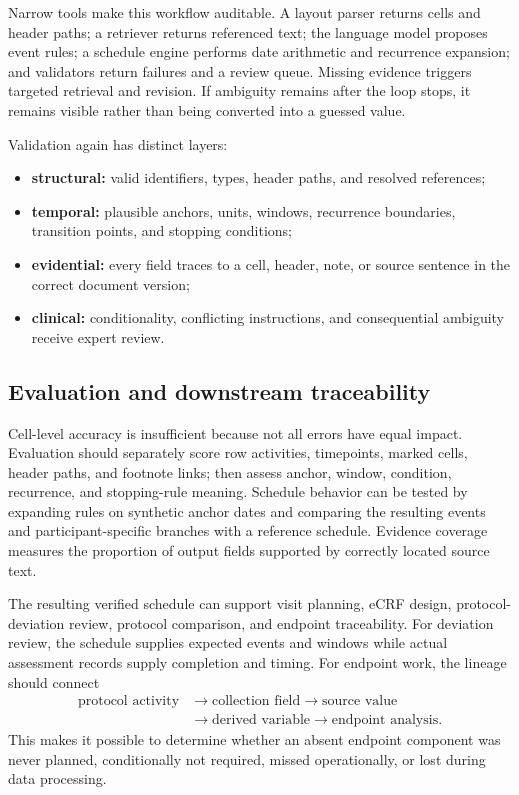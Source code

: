 \documentclass[12pt,oneside]{book}
\numberwithin{equation}{section}
\theoremstyle{definition}
\theoremstyle{plain}
\theoremstyle{remark}
\begin{document}
Narrow tools make this workflow auditable.  A layout parser returns cells and
header paths; a retriever returns referenced text; the language model proposes
event rules; a schedule engine performs date arithmetic and recurrence
expansion; and validators return failures and a review queue.  Missing evidence
triggers targeted retrieval and revision.  If ambiguity remains after the loop
stops, it remains visible rather than being converted into a guessed value.

Validation again has distinct layers:
\begin{itemize}
    \item \textbf{structural:} valid identifiers, types, header paths, and
    resolved references;
    \item \textbf{temporal:} plausible anchors, units, windows, recurrence
    boundaries, transition points, and stopping conditions;
    \item \textbf{evidential:} every field traces to a cell, header, note, or
    source sentence in the correct document version;
    \item \textbf{clinical:} conditionality, conflicting instructions, and
    consequential ambiguity receive expert review.
\end{itemize}

\subsection{Evaluation and downstream traceability}

Cell-level accuracy is insufficient because not all errors have equal impact.
Evaluation should separately score row activities, timepoints, marked cells,
header paths, and footnote links; then assess anchor, window, condition,
recurrence, and stopping-rule meaning.  Schedule behavior can be tested by
expanding rules on synthetic anchor dates and comparing the resulting events
and participant-specific branches with a reference schedule.  Evidence
coverage measures the proportion of output fields supported by correctly
located source text.

The resulting verified schedule can support visit planning, eCRF design,
protocol-deviation review, protocol comparison, and endpoint traceability.
For deviation review, the schedule supplies expected events and windows while
actual assessment records supply completion and timing.  For endpoint work,
the lineage should connect
\[
\begin{aligned}
  \text{protocol activity}
  &\longrightarrow\text{collection field}
  \longrightarrow\text{source value}\\
  &\longrightarrow\text{derived variable}
  \longrightarrow\text{endpoint analysis}.
\end{aligned}
\]
This makes it possible to determine whether an absent endpoint component was
never planned, conditionally not required, missed operationally, or lost during
data processing.
\end{document}

